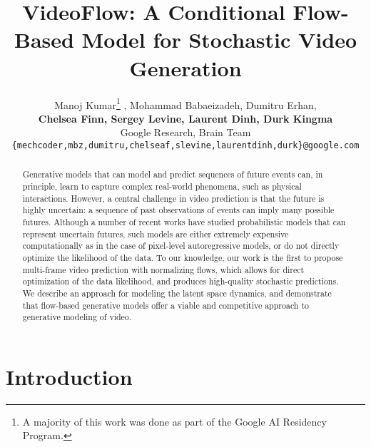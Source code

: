 \documentclass{article} \usepackage{iclr2020_conference,times}
\title{VideoFlow: A Conditional Flow-Based Model for Stochastic Video Generation}
\author{Manoj Kumar\thanks{A majority of this work was done as part of the Google AI Residency Program.} , Mohammad Babaeizadeh, Dumitru Erhan, \\
\textbf{Chelsea Finn, Sergey Levine, Laurent Dinh, Durk Kingma} \\
Google Research, Brain Team \\
\texttt{\{mechcoder,mbz,dumitru,chelseaf,slevine,laurentdinh,durk\}@google.com} \\
}
\begin{document}
\maketitle

\begin{abstract}
Generative models that can model and predict
sequences of future events can, in principle, learn to capture complex real-world phenomena, such as physical interactions. However, a central challenge in video prediction is that the future is highly uncertain: a sequence of past observations of events can imply many possible futures. Although a number of recent works have studied probabilistic models that can represent uncertain futures, such models are either extremely expensive computationally as in the case of pixel-level autoregressive models, or do not directly optimize the likelihood of the data. To our knowledge, our work is the first to propose multi-frame video prediction with normalizing flows, which allows for direct optimization of the data likelihood, and produces high-quality stochastic predictions. We describe an approach for modeling the latent space dynamics, and demonstrate that flow-based generative models offer a viable and competitive approach to generative modeling of video.
\end{abstract}

\section{Introduction}
\end{document}
